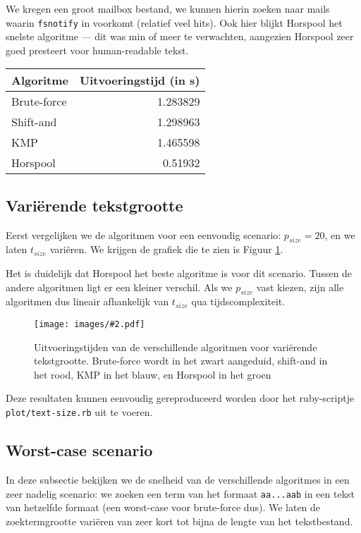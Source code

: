 \documentclass[a4paper,11pt]{article}
\newcommand{\image}[3][1]{
    \begin{figure}
    \begin{center}
    \texttt{[image: images/\#2.pdf]}
    \caption{#3}
    \label{fig:#2}
    \end{center}
    \end{figure}
}
\newcommand{\reproduce}[1]{
    Deze resultaten kunnen eenvoudig gereproduceerd worden door het
    ruby-scriptje \texttt{#1} uit te voeren.
}
\begin{document}
We kregen een groot mailbox bestand, we kunnen hierin zoeken naar mails waarin
\verb#fsnotify# in voorkomt (relatief veel hits). Ook hier blijkt Horspool het
snelste algoritme — dit was min of meer te verwachten, aangezien Horspool zeer
goed presteert voor human-readable tekst.

\begin{center}
\begin{tabular}{lr}
    Algoritme & Uitvoeringstijd (in s) \\
    \hline
    Brute-force & 1.283829 \\
    Shift-and & 1.298963 \\
    KMP & 1.465598 \\
    Horspool & 0.51932 \\
\end{tabular}
\end{center}

\subsection{Vari\"erende tekstgrootte}

Eerst vergelijken we de algoritmen voor een eenvoudig scenario: $p_{size} = 20$,
en we laten $t_{size}$ vari\"eren. We krijgen de grafiek die te zien is Figuur
\ref{fig:plot-text-size}.

Het is duidelijk dat Horspool het beste algoritme is voor dit scenario.
Tussen de andere algoritmen ligt er een kleiner verschil. Als we $p_{size}$
vast kiezen, zijn alle algoritmen dus lineair afhankelijk van $t_{size}$ qua
tijdscomplexiteit.

\image{plot-text-size}{Uitvoeringstijden van de verschillende algoritmen voor
vari\"erende tekstgrootte. Brute-force wordt in het zwart aangeduid, shift-and
in het rood, KMP in het blauw, en Horspool in het groen}

\reproduce{plot/text-size.rb}

\subsection{Worst-case scenario}

In deze subsectie bekijken we de snelheid van de verschillende algoritmes in
een zeer nadelig scenario: we zoeken een term van het formaat \verb#aa...aab#
in een tekst van hetzelfde formaat (een worst-case voor brute-force dus). We
laten de zoektermgrootte vari\"eren van zeer kort tot bijna de lengte van het
tekstbestand.
\end{document}
